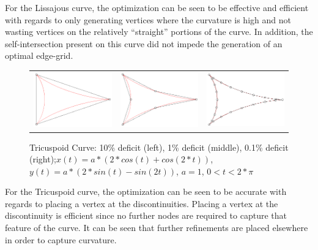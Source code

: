 For the Lissajous curve, the optimization can be seen to be effective and efficient with regards to only generating vertices where the curvature is high and not wasting vertices on the relatively ``straight'' portions of the curve. In addition, the self-intersection present on this curve did not impede the generation of an optimal edge-grid.

\begin{figure}[h!]
  \centering
  \begin{tabular}{ccc}
  \includegraphics[width=0.3\linewidth]{Figures/tricuspoid01.png} &
  \includegraphics[width=0.3\linewidth]{Figures/tricuspoid001.png} &
  \includegraphics[width=0.3\linewidth]{Figures/tricuspoid0001.png}
  \end{tabular}
  \caption{\label{fig:tricuspoid} Tricuspoid Curve: 10\% deficit (left), 1\% deficit (middle), 0.1\% deficit (right);\newline $x(t) = a*(2*cos(t) + cos(2*t))$, $y(t) = a*(2*sin(t) - sin(2t))$, $a=1$, $0<t<2*\pi$}
\end{figure}

For the Tricuspoid curve, the optimization can be seen to be accurate with regards to placing a vertex at the discontinuities. Placing a vertex at the discontinuity is efficient since no further nodes are required to capture that feature of the curve. It can be seen that further refinements are placed elsewhere in order to capture curvature.

